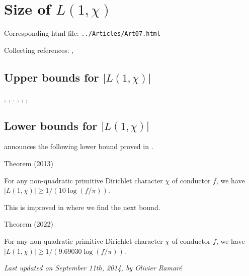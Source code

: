 \chapter{   Size of $L(1,\chi)$}

Corresponding html file: \texttt{../Articles/Art07.html}









Collecting references:
\cite{Louboutin*93},


\section{Upper bounds for $|L(1,\chi)|$}


\cite{Louboutin*96},
\cite{Granville-Soundararajan*02},
\cite{Granville-Soundararajan*04}.
\cite{Ramare*01},
\cite{Ramare*02-??},
\cite{Louboutin*98},

\section{Lower bounds for $|L(1,\chi)|$}

\cite{Louboutin*13}
announces the following lower bound proved in
\cite{Louboutin*15}
.

\begin{thm}{Theorem (2013)}

For any non-quadratic primitive Dirichlet character $\chi$ of conductor $f$,
we have $|L(1,\chi)|\ge 1/ ( 10\log(f/\pi))$.
\end{thm}


This is improved in
\cite{Mossinghoff-Starichkova-Trudgian*22}
where we find the next bound.
\begin{thm}{Theorem (2022)}

For any non-quadratic primitive Dirichlet character $\chi$ of conductor $f$,
we have $|L(1,\chi)|\ge 1/ ( 9.69030\log(f/\pi))$.
\end{thm}




 
 








  
\begin{flushright}\small\sl{}   Last updated on September 11th, 2014, by Olivier Ramar\'e
 \end{flushright}















